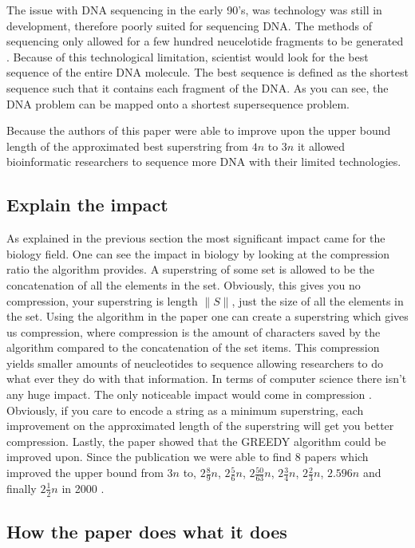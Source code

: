 \documentclass[letterpaper,twocolumn,11pt,titlepage]{article}
\begin{document}
The issue with DNA sequencing in the early 90's, was technology was still in development, therefore poorly suited for sequencing DNA. The methods of sequencing only allowed for a few hundred neucelotide fragments to be generated \cite{karp1993mapping}. Because of this technological limitation, scientist would look for the best sequence of the entire DNA molecule. The best sequence is defined as the shortest sequence such that it contains each fragment of the DNA. As you can see, the DNA problem can be mapped onto a shortest supersequence problem. 

Because the authors of this paper were able to improve upon the upper bound length of the approximated best superstring from $4n$ to $3n$ it allowed bioinformatic researchers to sequence more DNA with their limited technologies. 



\subsection*{Explain the impact}
As explained in the previous section the most significant impact came for the biology field. One can see the impact in biology by looking at the compression ratio the algorithm provides. A superstring of some set is allowed to be the concatenation of all the elements in the set. Obviously, this gives you no compression, your superstring is length $\| S \|$, just the size of all the elements in the set. Using the algorithm in the paper one can create a superstring which gives us compression, where compression is the amount of characters saved by the algorithm compared to the concatenation of the set items. This compression yields smaller amounts of neucleotides to sequence allowing researchers to do what ever they do with that information.  In terms of computer science there isn't any huge impact.  The only noticeable impact would come in compression \cite{storer1988data}. Obviously, if you care to encode a string as a minimum superstring, each improvement on the approximated length of the superstring will get you better compression. Lastly, the paper showed that the GREEDY algorithm could be improved upon. Since the publication we were able to find 8 papers which improved the upper bound from $3n$ to, $2 \frac{8}{9}n$, $2 \frac{5}{6}n$, $2 \frac{50}{63}n$, $2 \frac{3}{4}n$, $2 \frac{2}{3}n$, $2.596n$ and finally $2 \frac{1}{2}n$ in 2000 \cite{sweedyk2000boldmath}.



\subsection*{How the paper does what it does}
\end{document}

